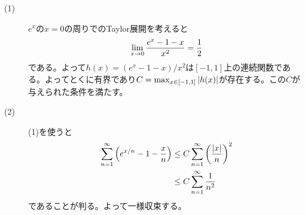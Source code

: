 \newpage


\subsubsection{}%
\begin{sol} ${}$
  \begin{description}
    \item[(1)] $e^x$の$x=0$の周りでのTaylor展開を考えると
    \[
    \lim_{x \to 0} \frac{ e^x - 1 -x}{x^2 } = \frac{1}{2}
    \]
    である。よって$h(x)=  (e^x - 1 -x )/x^2$は$[-1,1]$上の連続関数である。よってとくに有界であり$C = \max_{x \in [-1,1]} \left \lvert h(x) \right \rvert$が存在する。この$C$が与えられた条件を満たす。
    \item[(2)] (1)を使うと
    \begin{align*}
      \sum_{n=1}^{\infty} \left( e^{x/n} - 1 - \frac{x}{n} \right) &\leq C \sum_{n=1}^{\infty} \left( \frac{ \left \lvert x \right \rvert }{n} \right)^2 \\
      &\leq   C \sum_{n=1}^{\infty}  \frac{ 1}{n^2}
    \end{align*}
    であることが判る。よって一様収束する。
  \end{description}
\end{sol}
